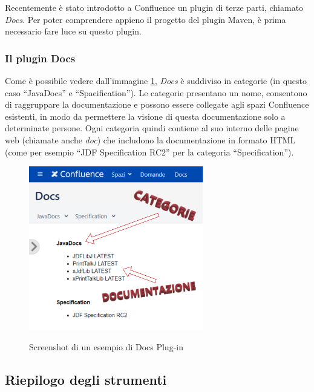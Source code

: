     Recentemente è stato introdotto a Confluence un plugin di terze parti, chiamato \emph{Docs}. 
    Per poter comprendere appieno il progetto del plugin Maven, è prima necessario fare luce su questo plugin.

    \subsubsection{Il plugin Docs} \label{pluginDocs}

    Come è possibile vedere dall'immagine \ref{screenDocs}, \emph{Docs} è suddiviso in categorie (in questo caso ``JavaDocs'' e ``Spacification'').
    Le categorie presentano un nome, consentono di raggruppare la documentazione e possono essere collegate agli spazi Confluence esistenti, in modo da permettere la visione di questa documentazione solo a determinate persone.
    Ogni categoria quindi contiene al suo interno delle pagine web (chiamate anche \emph{doc}) che includono la documentazione in formato HTML (come per esempio ``JDF Specification RC2'' per la categoria ``Specification'').

    \begin{figure}[H]
        \centering
        \includegraphics[width=0.68\textwidth]{immagini/docs-conf.png}\\
        \caption{Screenshot di un esempio di Docs Plug-in}
        \label{screenDocs}
    \end{figure}




    \newpage

    \subsection{Riepilogo degli strumenti}

